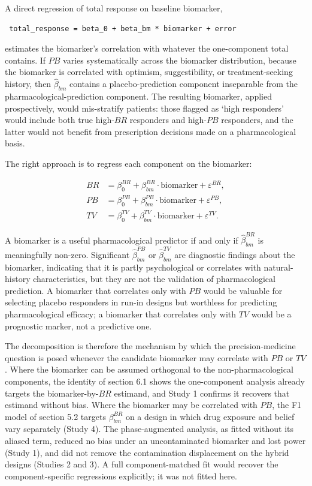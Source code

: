 \documentclass[
  11pt,
]{article}
\begin{document}
A direct regression of total response on baseline biomarker,

\begin{verbatim} total_response = beta_0 + beta_bm * biomarker + error
\end{verbatim}

estimates the biomarker's correlation with whatever the one-component total
contains. If \(PB\) varies systematically across the biomarker distribution,
because the biomarker is correlated with optimism, suggestibility, or
treatment-seeking history, then \(\hat{\beta}_{bm}\) contains a
placebo-prediction component inseparable from the pharmacological-prediction
component. The resulting biomarker, applied prospectively, would mis-stratify
patients: those flagged as `high responders' would include both true high-\(BR\)
responders and high-\(PB\) responders, and the latter would not benefit from
prescription decisions made on a pharmacological basis.

The right approach is to regress each component on the biomarker:

\begin{align*} BR &= \beta_0^{BR} + \beta_{bm}^{BR} \cdot \mathrm{biomarker} +
\varepsilon^{BR},\\ PB &= \beta_0^{PB} + \beta_{bm}^{PB} \cdot
\mathrm{biomarker} + \varepsilon^{PB},\\ TV &= \beta_0^{TV} + \beta_{bm}^{TV}
\cdot \mathrm{biomarker} + \varepsilon^{TV}. \end{align*}

A biomarker is a useful pharmacological predictor if and only if
\(\hat{\beta}_{bm}^{BR}\) is meaningfully non-zero. Significant
\(\hat{\beta}_{bm}^{PB}\) or \(\hat{\beta}_{bm}^{TV}\) are diagnostic findings
about the biomarker, indicating that it is partly psychological or correlates
with natural-history characteristics, but they are not the validation of
pharmacological prediction. A biomarker that correlates only with \(PB\) would
be valuable for selecting placebo responders in run-in designs but worthless
for predicting pharmacological efficacy; a biomarker that correlates only with
\(TV\) would be a prognostic marker, not a predictive one.

The decomposition is therefore the mechanism by which the precision-medicine
question is posed whenever the candidate biomarker may correlate with \(PB\) or
\(TV\). Where the biomarker can be assumed orthogonal to the non-pharmacological
components, the identity of section 6.1 shows the one-component analysis
already targets the biomarker-by-\(BR\) estimand, and Study 1 confirms it
recovers that estimand without bias. Where the biomarker may be correlated
with \(PB\), the F1 model of section 5.2 targets \(\beta_{bm}^{BR}\) on a
design in which drug exposure and belief vary separately (Study 4). The
phase-augmented analysis, as fitted without its aliased term, reduced no
bias under an uncontaminated biomarker and lost power (Study 1), and did
not remove the contamination displacement on the hybrid designs (Studies 2
and 3). A full component-matched fit would recover the component-specific
regressions explicitly; it was not fitted here.
\end{document}
